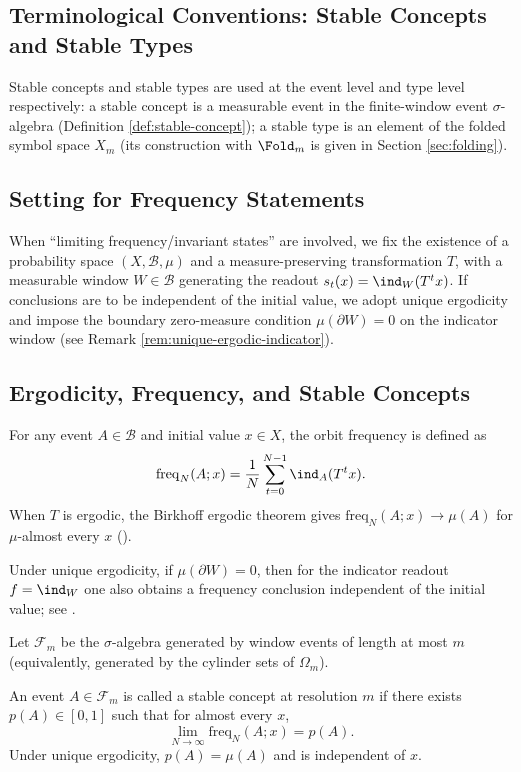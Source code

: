 \subsection{Terminological Conventions: Stable Concepts and Stable Types}
Stable concepts and stable types are used at the event level and type level respectively: a stable concept is a measurable event in the finite-window event \(\sigma\)-algebra (Definition \ref{def:stable-concept}); a stable type is an element of the folded symbol space \(X_m\) (its construction with \(\Fold_m\) is given in Section \ref{sec:folding}).

\subsection{Setting for Frequency Statements}\label{subsec:freq-setting}
When ``limiting frequency/invariant states'' are involved, we fix the existence of a probability space \((X,\mathcal{B},\mu)\) and a measure-preserving transformation \(T\), with a measurable window \(W\in\mathcal{B}\) generating the readout \(s_t(x)=\ind_W(T^t x)\). If conclusions are to be independent of the initial value, we adopt unique ergodicity and impose the boundary zero-measure condition \(\mu(\partial W)=0\) on the indicator window (see Remark \ref{rem:unique-ergodic-indicator}).

\subsection{Ergodicity, Frequency, and Stable Concepts}\label{subsec:prelim-ergodic-frequency}
For any event \(A\in\mathcal{B}\) and initial value \(x\in X\), the orbit frequency is defined as
\[
\mathrm{freq}_N(A;x)=\frac1N\sum_{t=0}^{N-1}\ind_A(T^t x).
\]
When \(T\) is ergodic, the Birkhoff ergodic theorem gives \(\mathrm{freq}_N(A;x)\to\mu(A)\) for \(\mu\)-almost every \(x\) (\cite{WaltersErgodicTheory}).

\begin{remark}\label{rem:unique-ergodic-indicator}
Under unique ergodicity, if \(\mu(\partial W)=0\), then for the indicator readout \(f=\ind_W\) one also obtains a frequency conclusion independent of the initial value; see \cite{WaltersErgodicTheory}.
\end{remark}

Let \(\mathcal{F}_m\) be the \(\sigma\)-algebra generated by window events of length at most \(m\) (equivalently, generated by the cylinder sets of \(\Omega_m\)).
\begin{definition}\label{def:stable-concept}
An event \(A\in\mathcal{F}_m\) is called a stable concept at resolution \(m\) if there exists \(p(A)\in[0,1]\) such that for almost every \(x\),
\[
\lim_{N\to\infty}\mathrm{freq}_N(A;x)=p(A).
\]
Under unique ergodicity, \(p(A)=\mu(A)\) and is independent of \(x\).
\end{definition}

